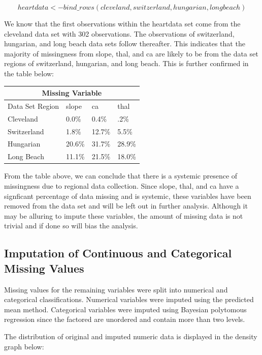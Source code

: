 \documentclass[12pt]{article}
\begin{document}
  \[heartdata <-bind\_rows(cleveland,switzerland,hungarian,longbeach)\]

We know that the first observations within the heartdata set come from the cleveland data set with 302 observations. The observations of switzerland, hungarian, and long beach data sets follow thereafter. This indicates that the majority of missingness from slope, thal, and ca are likely to be from the data set regions of switzerland, hungarian, and long beach. This is further confirmed in the table below: 
\begin{center}
\begin{tabular}{|p{3.5cm}|p{1.5cm}|p{1.5cm}|p{1.5cm}|}
\hline
\multicolumn{4}{|c|}{Missing Variable}\\
\hline
Data Set Region & slope & ca & thal\\
\hline
Cleveland & 0.0\% & 0.4\% & .2\%\\
Switzerland & 1.8\% & 12.7\% & 5.5\%\\
Hungarian & 20.6\% & 31.7\% & 28.9\%\\
Long Beach & 11.1\% & 21.5\% & 18.0\%\\
\hline
\end{tabular}
\end{center}

From the table above, we can conclude that there is a systemic presence of missingness due to regional data collection. Since slope, thal, and ca have a signficant percentage of data missing and is systemic, these variables have been removed from the data set and will be left out in further analysis. Although it may be alluring to impute these variables, the amount of missing data is not trivial and if done so will bias the analysis. 
\pagebreak
\subsection{Imputation of Continuous and Categorical Missing Values}
Missing values for the remaining variables were split into numerical and categorical classifications. Numerical variables were imputed using the predicted mean method. Categorical variables were imputed using Bayesian polytomous regression since the factored are unordered and contain more than two levels. 

The distribution of original and imputed numeric data is displayed in the density graph below: 
\end{document}
